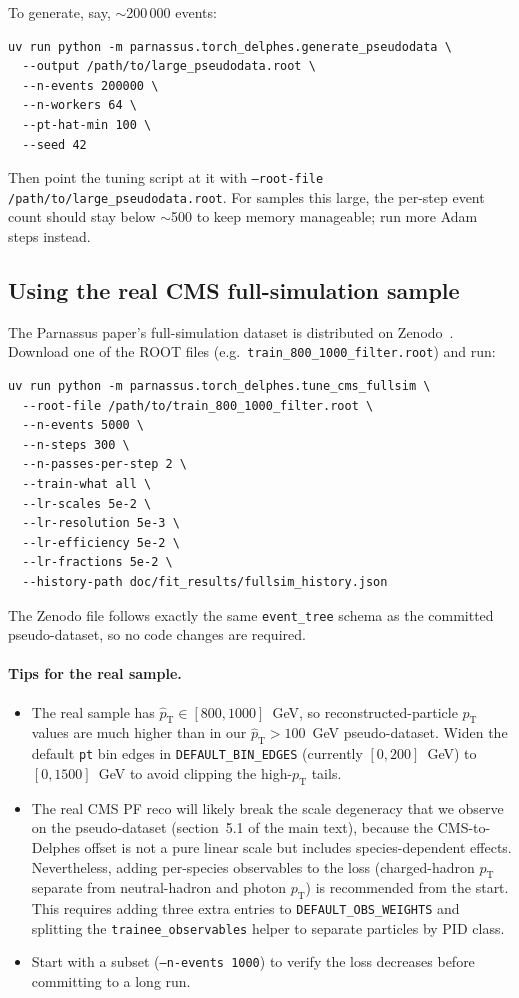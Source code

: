 \documentclass[a4paper,11pt]{article}
\begin{document}
To generate, say, $\sim$200\,000 events:

\begin{verbatim}
uv run python -m parnassus.torch_delphes.generate_pseudodata \
  --output /path/to/large_pseudodata.root \
  --n-events 200000 \
  --n-workers 64 \
  --pt-hat-min 100 \
  --seed 42
\end{verbatim}

Then point the tuning script at it with \texttt{--root-file
/path/to/large\_pseudodata.root}. For samples this large, the
per-step event count should stay below $\sim$500 to keep memory
manageable; run more Adam steps instead.

\subsection{Using the real CMS full-simulation sample}

The Parnassus paper's full-simulation dataset is distributed on
Zenodo~\cite{parnassus_zenodo}. Download one of the ROOT files
(e.g.\ \texttt{train\_800\_1000\_filter.root}) and run:

\begin{verbatim}
uv run python -m parnassus.torch_delphes.tune_cms_fullsim \
  --root-file /path/to/train_800_1000_filter.root \
  --n-events 5000 \
  --n-steps 300 \
  --n-passes-per-step 2 \
  --train-what all \
  --lr-scales 5e-2 \
  --lr-resolution 5e-3 \
  --lr-efficiency 5e-2 \
  --lr-fractions 5e-2 \
  --history-path doc/fit_results/fullsim_history.json
\end{verbatim}

The Zenodo file follows exactly the same \texttt{event\_tree} schema
as the committed pseudo-dataset, so no code changes are required.

\paragraph{Tips for the real sample.}
\begin{itemize}
\item The real sample has $\hat{p}_\mathrm{T}\in[800,1000]$~GeV, so
  reconstructed-particle $p_\mathrm{T}$ values are much higher than
  in our $\hat{p}_\mathrm{T}>100$~GeV pseudo-dataset. Widen the
  default \texttt{pt} bin edges in \texttt{DEFAULT\_BIN\_EDGES}
  (currently $[0,200]$~GeV) to $[0,1500]$~GeV to avoid clipping the
  high-$p_\mathrm{T}$ tails.
\item The real CMS PF reco will likely break the scale degeneracy
  that we observe on the pseudo-dataset (section~5.1 of the main
  text), because the CMS-to-Delphes offset is not a pure linear
  scale but includes species-dependent effects. Nevertheless, adding
  per-species observables to the loss (charged-hadron $p_\mathrm{T}$
  separate from neutral-hadron and photon $p_\mathrm{T}$) is
  recommended from the start. This requires adding three extra
  entries to \texttt{DEFAULT\_OBS\_WEIGHTS} and splitting the
  \texttt{trainee\_observables} helper to separate particles by
  PID class.
\item Start with a subset (\texttt{--n-events 1000}) to verify the
  loss decreases before committing to a long run.
\end{itemize}
\end{document}
